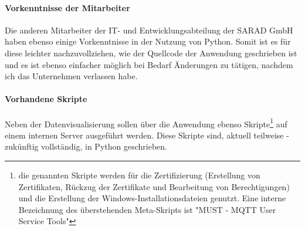 \documentclass[letterpaper,11pt,leqno]{article}
\begin{document}
\paragraph{Vorkenntnisse der Mitarbeiter}Die anderen Mitarbeiter der IT- und Entwicklungsabteilung der SARAD GmbH haben ebenso
einige Vorkenntnisse in der Nutzung von Python. Somit ist es für diese leichter nachzuvollziehen, wie der Quellcode der Anwendung
geschrieben ist und es ist ebenso einfacher möglich bei Bedarf Änderungen zu tätigen, nachdem ich das Unternehmen verlassen habe.
\paragraph{Vorhandene Skripte}Neben der Datenvisualisierung sollen über die Anwendung ebenso Skripte\footnote{die genannten Skripte
werden für die Zertifizierung (Erstellung von Zertifikaten, Rückzug der Zertifikate und Bearbeitung von Berechtigungen) und die
Erstellung der Windows-Installationsdateien genutzt. Eine interne Bezeichnung des überstehenden Meta-Skripts ist "MUST - MQTT User
Service Tools"} auf einem internen Server ausgeführt werden. Diese Skripte sind, aktuell teilweise - zukünftig vollständig, in
Python geschrieben.
\end{document}
